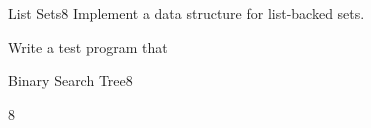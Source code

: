 \documentclass[a4paper]{article}
\begin{document}
\header

\begin{problem}{List Sets}{8}
Implement a data structure for list-backed sets.

Write a test program that
\end{problem}

\begin{problem}{Binary Search Tree}{8}
\end{problem}

\begin{problem}{}{8}

\end{problem}
\end{document}
